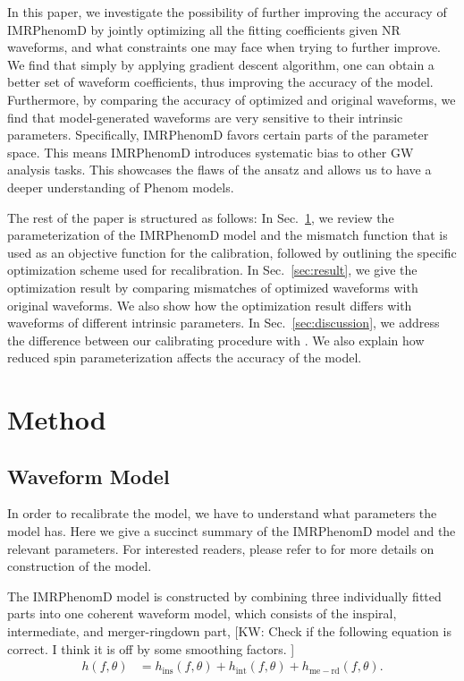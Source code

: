 \documentclass[twocolumn]{aastex631}
\newcommand{\kw}[1]{{\color{rb4}[KW: #1 ]}}
\begin{document}
In this paper, we investigate the possibility of further improving the accuracy
of IMRPhenomD by jointly optimizing all the fitting coefficients given NR
waveforms, and what constraints one may face when trying to further improve. We
find that simply by applying gradient descent algorithm, one can obtain a better
set of waveform coefficients, thus improving the accuracy of the model.
Furthermore, by comparing the accuracy of optimized and original waveforms, we
find that model-generated waveforms are very sensitive to their intrinsic
parameters. Specifically, IMRPhenomD favors certain parts of the parameter
space. This means IMRPhenomD introduces systematic bias to other GW analysis
tasks. This showcases the flaws of the ansatz and allows us to have a deeper
understanding of Phenom models.  

The rest of the paper is structured as follows: In Sec.~\ref{sec:method}, we
review the parameterization of the IMRPhenomD model and the mismatch function
that is used as an objective function for the calibration, followed by outlining the
specific optimization scheme used for recalibration. In
Sec.~\ref{sec:result}, we give the optimization result by comparing mismatches
of optimized waveforms with original waveforms. We also show how the
optimization result differs with waveforms of different intrinsic parameters. In
Sec.~\ref{sec:discussion}, we address the difference between our calibrating
procedure with \citep{khan2016frequency}. We also explain how reduced spin
parameterization affects the accuracy of the model. 

\section{Method} \label{sec:method}

\subsection{Waveform Model} \label{subsec:waveform_model}

In order to recalibrate the model, we have to understand what parameters the model has.
Here we give a succinct summary of the IMRPhenomD model and the relevant parameters.
For interested readers, please refer to \cite{khan2016frequency} for more details on construction of the model.


The IMRPhenomD model is constructed by combining three individually fitted parts
into one coherent waveform model, which consists of the inspiral, intermediate, and merger-ringdown part, 
\kw{Check if the following equation is correct. I think it is off by some smoothing factors.}
\begin{align}
	h(f,\theta)&=h_{\mathrm{ins}}(f,\theta) + h_{\mathrm{int}}(f,\theta) + h_{\mathrm{me-rd}}(f,\theta).
\end{align}
\end{document}
